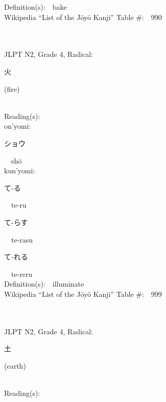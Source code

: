\begin{multicols}{2}
Definition(s):\ \ bake \\
Wikipedia ``List of the J\=oy\=o Kanji'' Table \#:\ \ 990 \\
\ \ \\
{\fontsize{34pt}{40pt}  }\ \ \\  %
{JLPT N2, Grade 4, Radical:\ \ {\begin{CJK}{UTF8}{min} 火 \end{CJK}} (fire) } \\
Reading(s):\ \ \\
{\hspace*{1em}}on'yomi:\ \ \\
{\hspace*{2em}}{\begin{CJK}{UTF8}{min} ショウ \end{CJK}}\ \ sh\=o\ \ \\
{\hspace*{1em}}kun'yomi:\ \ \\
{\hspace*{2em}}{\begin{CJK}{UTF8}{min} て-る \end{CJK}}\ \ te-ru\ \ \\
{\hspace*{2em}}{\begin{CJK}{UTF8}{min} て-らす \end{CJK}}\ \ te-rasu\ \ \\
{\hspace*{2em}}{\begin{CJK}{UTF8}{min} て-れる \end{CJK}}\ \ te-reru\ \ \\
Definition(s):\ \ illuminate \\
Wikipedia ``List of the J\=oy\=o Kanji'' Table \#:\ \ 999 \\
\ \ \\
{\fontsize{34pt}{40pt}  }\ \ \\  %
{JLPT N2, Grade 4, Radical:\ \ {\begin{CJK}{UTF8}{min} 土 \end{CJK}} (earth) } \\
Reading(s):\ \ \\

\end{multicols}
